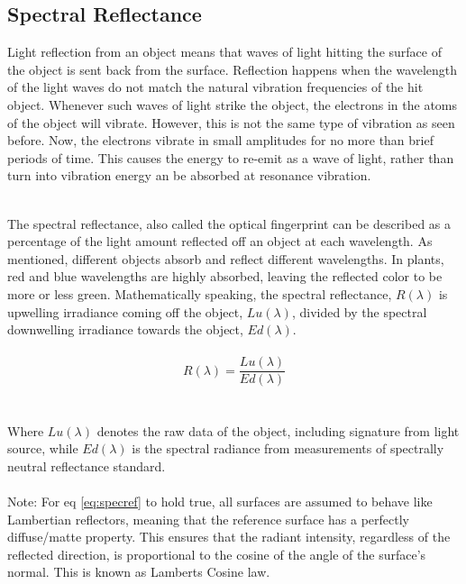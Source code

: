 \subsection{Spectral Reflectance}
Light reflection from an object means that waves of light hitting the surface of the object is sent back from the surface. Reflection happens when the wavelength of the light waves do not match the natural vibration frequencies of the hit object. Whenever such waves of light strike the object, the electrons in the atoms of the object will vibrate. However, this is not the same type of vibration as seen before. Now, the electrons vibrate in small amplitudes for no more than brief periods of time. This causes the energy to re-emit as a wave of light, rather than turn into vibration energy an be absorbed at resonance vibration. 
\\\\

The spectral reflectance, also called the optical fingerprint can be described as a percentage of the light amount reflected off an object at each wavelength. As mentioned, different objects absorb and reflect different wavelengths. In plants, red and blue wavelengths are highly absorbed, leaving the reflected color to be more or less green. Mathematically speaking, the spectral reflectance, $R(\lambda)$ is upwelling irradiance coming off the object, $Lu(\lambda)$, divided by the spectral downwelling irradiance towards the object, $Ed(\lambda)$.
\\\\
\begin{equation} \label{eq:specref}
    R(\lambda) = \frac{Lu(\lambda)}{Ed(\lambda)}
\end{equation}
\\\\
Where $Lu(\lambda)$ denotes the raw data of the object, including signature from light source, while $Ed(\lambda)$ is the spectral radiance from measurements of spectrally neutral reflectance standard.
\\\\
Note: For eq \ref{eq:specref} to hold true, all surfaces are assumed to behave like Lambertian reflectors, meaning that the reference surface has a perfectly diffuse/matte property. This ensures that the radiant intensity, regardless of the reflected direction, is proportional to the cosine of the angle of the surface's normal. This is known as Lamberts Cosine law. 


